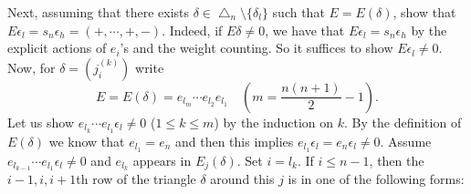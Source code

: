 Next, assuming that there exists ${\delta}\in{\bigtriangleup}_n\setminus\{{\delta}_l\}$ 
such that 
$E=E({\delta})$, show that $E{\epsilon}_l=s_n{\epsilon}_h=(+,{\cdots},+,-)$.
Indeed, if $E{\delta}\ne0$, we have that 
$E{\epsilon}_l=s_n{\epsilon}_h$ by the explicit actions of $e_i$'s 
and the weight counting.
So it suffices to show $E{\epsilon}_l\ne0$.
Now, for ${\delta}=({j_{i}^{(k)}})$ write 
\[
E= E({\delta})=e_{l_m}{\cdots} e_{l_2}e_{l_1}{\quad}(m=\frac{n(n+1)}{2}-1).
\]
Let us show $e_{l_k}{\cdots} e_{l_1}{\epsilon}_l\ne0$ 
($1\leq k\leq m$) by the induction on $k$.
By the definition of $E({\delta})$ we know that $e_{l_1}=e_n$ and then 
this implies $e_{l_1}{\epsilon}_l=e_n{\epsilon}_l\ne0$.
Assume $e_{l_{k-1}}{\cdots} e_{l_1}{\epsilon}_l\ne0$ and  $e_{l_k}$ 
appears in $E_j({\delta})$. Set $i=l_k$.
If $i\leq n-1$, then the $i-1,i,i+1$th row of the triangle ${\delta}$ 
around this $j$ is in one of the following forms:
